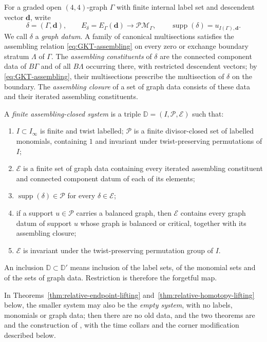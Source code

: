 For a graded open $(4,4)$-graph $\Gamma$ with finite internal label set and
descendent vector $\mathbf d$, write
\begin{equation}\label{eq:exact-GKT-datum}
 \delta=(\Gamma,\mathbf d),
 \qquad
 E_\delta=E_\Gamma(\mathbf d)\longrightarrow\mathcal{PM}_\Gamma,
 \qquad
 \operatorname{supp}(\delta)=u_{I(\Gamma),\mathbf d}.
\end{equation}
We call $\delta$ a \emph{graph datum}.  A family of canonical
multisections satisfies the assembling relation \eqref{eq:GKT-assembling} on
every zero or exchange boundary stratum $\Lambda$ of $\Gamma$.  The
\emph{assembling constituents} of $\delta$ are the connected component data
of $B\Gamma$ and of all $B\Lambda$ occurring there, with restricted
descendent vectors; by \eqref{eq:GKT-assembling}, their multisections
prescribe the multisection of $\delta$ on the boundary.  The
\emph{assembling closure} of a set of graph data consists of these data and
their iterated assembling constituents.

\begin{definition}\label{def:finite-partial-system}
A \emph{finite assembling-closed system} is a triple
$\mathbb D=(I,\mathscr P,\mathcal E)$ such that:
\begin{enumerate}
\item $I\subset I_\infty$ is finite and twist labelled; $\mathscr P$ is a finite
divisor-closed set of labelled monomials, containing $1$ and invariant under
twist-preserving permutations of $I$;
\item $\mathcal E$ is a finite set of graph data containing every iterated
assembling constituent and connected component datum of each of its elements;
\item $\operatorname{supp}(\delta)\in\mathscr P$ for every $\delta\in\mathcal E$;
\item if a support $u\in\mathscr P$ carries a balanced graph, then $\mathcal E$
contains every graph datum of support $u$ whose graph is balanced or
critical, together with its assembling closure;
\item $\mathcal E$ is invariant under the twist-preserving permutation group of $I$.
\end{enumerate}
An inclusion $\mathbb D\subset\mathbb D'$ means inclusion of the label sets,
of the monomial sets and of the sets of graph data.  Restriction is
therefore the forgetful map.
\end{definition}

In Theorems~\ref{thm:relative-endpoint-lifting}
and~\ref{thm:relative-homotopy-lifting} below, the smaller system may also
be the \emph{empty system}, with no labels, monomials or graph data; then
there are no old data, and the two theorems are
\cite[Thm.~5.13]{grossetal2022open} and the construction of
\cite[Lem.~3.40]{grossetal2022open}, with the time collars and the corner
modification described below.

